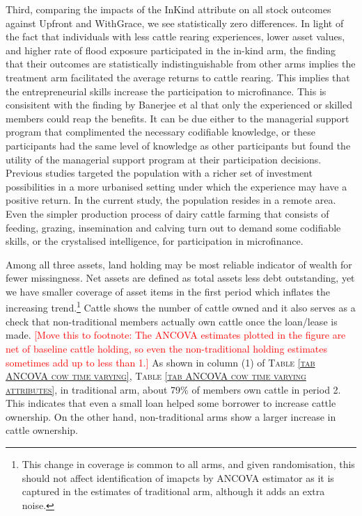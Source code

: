	Third, comparing the impacts of the \textsf{InKind} attribute on all stock outcomes against \textsf{Upfront} and \textsf{WithGrace}, we see statistically zero differences. In light of the fact that individuals with less cattle rearing experiences, lower asset values, and higher rate of flood exposure participated in the in-kind arm, the finding that their outcomes are statistically indistinguishable from other arms implies the treatment arm facilitated the average returns to cattle rearing. This implies that the entrepreneurial skills increase the participation to microfinance. This is consisitent with the finding by Banerjee et al that only the experienced or skilled members could reap the benefits. It can be due either to the managerial support program that complimented the necessary codifiable knowledge, or these participants had the same level of knowledge as other participants but found the utility of the managerial support program at their participation decisions. Previous studies targeted the population with a richer set of investment possibilities in a more urbanised setting under which the experience may have a positive return. In the current study, the population resides in a remote area. Even the simpler production process of dairy cattle farming that consists of feeding, grazing, insemination and calving turn out to demand some codifiable skills, or the crystalised intelligence, for participation in microfinance.
	
	Among all three assets, land holding may be most reliable indicator of wealth for fewer missingness. Net assets are defined as total assets less debt outstanding, yet we have smaller coverage of asset items in the first period which inflates the increasing trend.\footnote{This change in coverage is common to all arms, and given randomisation, this should not affect identification of imapcts by ANCOVA estimator as it is captured in the estimates of \textsf{traditional} arm, although it adds an extra noise. } Cattle shows the number of cattle owned and it also serves as a check that non-\textsf{traditional} members actually own cattle once the loan/lease is made. \textcolor{red}{[Move this to footnote: The ANCOVA estimates plotted in the figure are net of baseline cattle holding, so even the non-traditional holding estimates sometimes add up to less than 1.]} As shown in column (1) of \textsc{\normalsize Table \ref{tab ANCOVA cow time varying}}, \textsc{\normalsize Table \ref{tab ANCOVA cow time varying attributes}}, in \textsf{traditional} arm, about 79\% of members own cattle in period 2. This indicates that even a small loan helped some borrower to increase cattle ownership. On the other hand, non-\textsf{traditional} arms show a larger increase in cattle ownership. 


